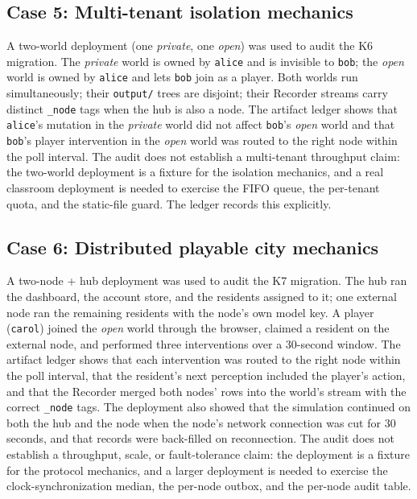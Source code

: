 \subsection{Case 5: Multi-tenant isolation mechanics}

A two-world deployment (one \emph{private}, one \emph{open}) was used to
audit the K6 migration.  The \emph{private} world is owned by
\texttt{alice} and is invisible to \texttt{bob}; the \emph{open} world
is owned by \texttt{alice} and lets \texttt{bob} join as a player.  Both
worlds run simultaneously; their \texttt{output/} trees are disjoint;
their Recorder streams carry distinct \texttt{\_node} tags when the hub
is also a node.  The artifact ledger shows that \texttt{alice}'s
mutation in the \emph{private} world did not affect \texttt{bob}'s
\emph{open} world and that \texttt{bob}'s player intervention in the
\emph{open} world was routed to the right node within the poll interval.
The audit does not establish a multi-tenant throughput claim: the
two-world deployment is a fixture for the isolation mechanics, and a
real classroom deployment is needed to exercise the FIFO queue, the
per-tenant quota, and the static-file guard.  The ledger records this
explicitly.

\subsection{Case 6: Distributed playable city mechanics}

A two-node + hub deployment was used to audit the K7 migration.  The
hub ran the dashboard, the account store, and the residents assigned
to it; one external node ran the remaining residents with the node's
own model key.  A player (\texttt{carol}) joined the \emph{open} world
through the browser, claimed a resident on the external node, and
performed three interventions over a 30-second window.  The artifact
ledger shows that each intervention was routed to the right node
within the poll interval, that the resident's next perception included
the player's action, and that the Recorder merged both nodes' rows into
the world's stream with the correct \texttt{\_node} tags.  The
deployment also showed that the simulation continued on both the hub
and the node when the node's network connection was cut for 30 seconds,
and that records were back-filled on reconnection.  The audit does not
establish a throughput, scale, or fault-tolerance claim: the deployment
is a fixture for the protocol mechanics, and a larger deployment is
needed to exercise the clock-synchronization median, the per-node
outbox, and the per-node audit table.

